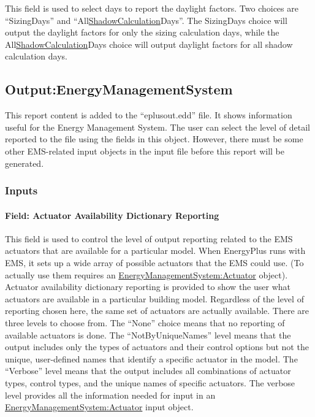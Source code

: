 This field is used to select days to report the daylight factors. Two choices are ``SizingDays'' and ``All\hyperref[shadowcalculation]{ShadowCalculation}Days''. The SizingDays choice will output the daylight factors for only the sizing calculation days, while the All\hyperref[shadowcalculation]{ShadowCalculation}Days choice will output daylight factors for all shadow calculation days.

\subsection{Output:EnergyManagementSystem}\label{outputenergymanagementsystem}

This report content is added to the ``eplusout.edd'' file. It shows information useful for the Energy Management System. The user can select the level of detail reported to the file using the fields in this object. However, there must be some other EMS-related input objects in the input file before this report will be generated.

\subsubsection{Inputs}\label{inputs-5-024}

\paragraph{Field: Actuator Availability Dictionary Reporting}\label{field-actuator-availability-dictionary-reporting}

This field is used to control the level of output reporting related to the EMS actuators that are available for a particular model. When EnergyPlus runs with EMS, it sets up a wide array of possible actuators that the EMS could use. (To actually use them requires an \hyperref[energymanagementsystemactuator]{EnergyManagementSystem:Actuator} object). Actuator availability dictionary reporting is provided to show the user what actuators are available in a particular building model. Regardless of the level of reporting chosen here, the same set of actuators are actually available. There are three levels to choose from. The ``None'' choice means that no reporting of available actuators is done. The ``NotByUniqueNames'' level means that the output includes only the types of actuators and their control options but not the unique, user-defined names that identify a specific actuator in the model. The ``Verbose'' level means that the output includes all combinations of actuator types, control types, and the unique names of specific actuators. The verbose level provides all the information needed for input in an \hyperref[energymanagementsystemactuator]{EnergyManagementSystem:Actuator} input object.

